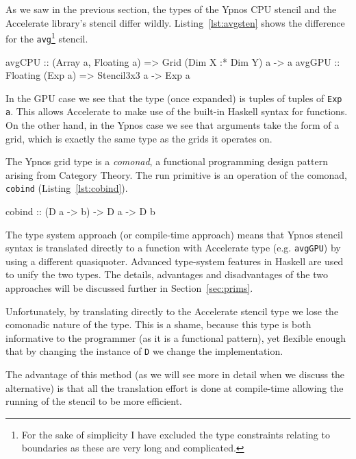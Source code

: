 \documentclass[12pt,a4paper,twoside]{scrbook}
\begin{document}
As we saw in the previous section, the types of the Ypnos CPU stencil and the
Accelerate library's stencil differ wildly. Listing~\ref{lst:avgsten} shows the
difference for the \texttt{avg}\footnote{For the sake of simplicity I have
  excluded the type constraints relating to boundaries as these are very long
  and complicated.}  stencil.

\begin{hflisting}[label={lst:avgsten}, caption={The average function implemented
on both the CPU and GPU. Notice how the types differ. The constraints are
simplified.}]
avgCPU :: (Array a, Floating a) =>
          Grid (Dim X :* Dim Y) a -> a
avgGPU :: Floating (Exp a) =>
          Stencil3x3 a -> Exp a
\end{hflisting}

In the GPU case we see that the type (once expanded) is tuples of tuples of
\texttt{Exp a}. This allows Accelerate to make use of the built-in Haskell
syntax for functions. On the other hand, in the Ypnos case we see that arguments
take the form of a grid, which is exactly the same type as the grids it operates
on.

The Ypnos grid type is a \emph{comonad}, a functional programming design pattern
arising from Category Theory\cite{uustalu2008}. The run primitive is an
operation of the comonad, \texttt{cobind} (Listing~\ref{lst:cobind}).

\begin{hflisting}[label={lst:cobind}, caption={The definition of cobind. Let
    \texttt{D} be a grid of a certain dimension and \texttt{a} and \texttt{b} be
    the types of that grid.}]
cobind :: (D a -> b) -> D a -> D b
\end{hflisting}

The type system approach (or compile-time approach) means that Ypnos stencil
syntax is translated directly to a function with Accelerate type
(e.g. \texttt{avgGPU}) by using a different quasiquoter. Advanced type-system
features in Haskell are used to unify the two types. The details, advantages and
disadvantages of the two approaches will be discussed further in
Section~\ref{sec:prims}.

Unfortunately, by translating directly to the Accelerate stencil type we lose
the comonadic nature of the type. This is a shame, because this type is both
informative to the programmer (as it is a functional pattern), yet flexible
enough that by changing the instance of \texttt{D} we change the implementation.

The advantage of this method (as we will see more in detail when we discuss the
alternative) is that all the translation effort is done at compile-time allowing
the running of the stencil to be more efficient.
\end{document}
